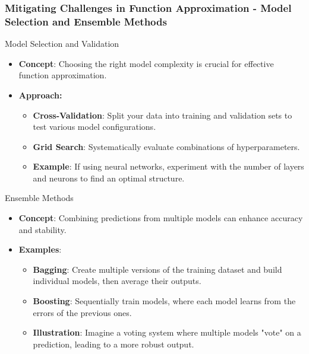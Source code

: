 \documentclass[aspectratio=169]{beamer}
\begin{document}
\begin{frame}[fragile]
    \frametitle{Mitigating Challenges in Function Approximation - Model Selection and Ensemble Methods}
    \begin{block}{Model Selection and Validation}
        \begin{itemize}
            \item \textbf{Concept}: Choosing the right model complexity is crucial for effective function approximation.
            \item \textbf{Approach:}
            \begin{itemize}
                \item \textbf{Cross-Validation}: Split your data into training and validation sets to test various model configurations.
                \item \textbf{Grid Search}: Systematically evaluate combinations of hyperparameters.
                \item \textbf{Example}: If using neural networks, experiment with the number of layers and neurons to find an optimal structure.
            \end{itemize}
        \end{itemize}
    \end{block}

    \begin{block}{Ensemble Methods}
        \begin{itemize}
            \item \textbf{Concept}: Combining predictions from multiple models can enhance accuracy and stability.
            \item \textbf{Examples}:
            \begin{itemize}
                \item \textbf{Bagging}: Create multiple versions of the training dataset and build individual models, then average their outputs.
                \item \textbf{Boosting}: Sequentially train models, where each model learns from the errors of the previous ones.
                \item \textbf{Illustration}: Imagine a voting system where multiple models "vote" on a prediction, leading to a more robust output.
            \end{itemize}
        \end{itemize}
    \end{block}
\end{frame}
\end{document}
